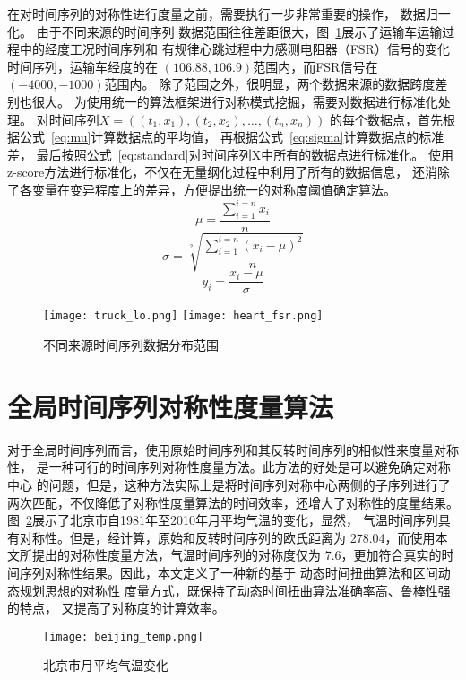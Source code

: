 在对时间序列的对称性进行度量之前，需要执行一步非常重要的操作，
数据归一化\cite{DBLP:journals/tec/HeITWNS21}。
由于不同来源的时间序列
数据范围往往差距很大，图~\ref{fig:data_range}展示了运输车运输过程中的经度工况时间序列和
有规律心跳过程中力感测电阻器（FSR）信号的变化时间序列，运输车经度的在
$(106.88,106.9)$范围内，而FSR信号在$(-4000,-1000)$范围内。
除了范围之外，很明显，两个数据来源的数据跨度差别也很大。
为使用统一的算法框架进行对称模式挖掘，需要对数据进行标准化处理。
对时间序列$X=\left(\left(t_{1}, x_{1}\right),\left(t_{2}, x_{2}\right), \ldots,\left(t_{n}, x_{n}\right)\right)$
的每个数据点，首先根据公式~\ref{eq:mu}计算数据点的平均值，
再根据公式~\ref{eq:sigma}计算数据点的标准差，
最后按照公式~\ref{eq:standard}对时间序列X中所有的数据点进行标准化。
使用z-score方法进行标准化，不仅在无量纲化过程中利用了所有的数据信息，
还消除了各变量在变异程度上的差异，方便提出统一的对称度阈值确定算法。
\begin{equation}
  \mu=\frac{\sum_{i=1}^{i=n} x_{i}}{n}
  \label{eq:mu}
\end{equation}
\begin{equation}
  \sigma=\sqrt[2]{\frac{\sum_{i=1}^{i=n}\left(x_{i}-\mu\right)^{2}}{n}}
  \label{eq:sigma}
\end{equation}
\begin{equation}
  y_{i}=\frac{x_{i}-\mu}{\sigma}
  \label{eq:standard}
\end{equation}
\begin{figure}
  \centering
  {\texttt{[image: truck\_lo.png]}}
  {\texttt{[image: heart\_fsr.png]}}
  \caption{不同来源时间序列数据分布范围}
  \label{fig:data_range}
\end{figure}

\section{全局时间序列对称性度量算法}

对于全局时间序列而言，使用原始时间序列和其反转时间序列的相似性来度量对称性，
是一种可行的时间序列对称性度量方法。此方法的好处是可以避免确定对称中心
的问题，但是，这种方法实际上是将时间序列对称中心两侧的子序列进行了
两次匹配，不仅降低了对称性度量算法的时间效率，还增大了对称性的度量结果。
图~\ref{fig:beijing_temp}展示了北京市自1981年至2010年月平均气温的变化，显然，
气温时间序列具有对称性。但是，经计算，原始和反转时间序列的欧氏距离为
278.04，而使用本文所提出的对称性度量方法，气温时间序列的对称度仅为
7.6，更加符合真实的时间序列对称性结果。因此，本文定义了一种新的基于
动态时间扭曲算法和区间动态规划思想的对称性
度量方式，既保持了动态时间扭曲算法准确率高、鲁棒性强的特点，
又提高了对称度的计算效率。
\begin{figure}
  \centering
  \texttt{[image: beijing\_temp.png]}
  \caption{北京市月平均气温变化}
  \label{fig:beijing_temp}
\end{figure}

